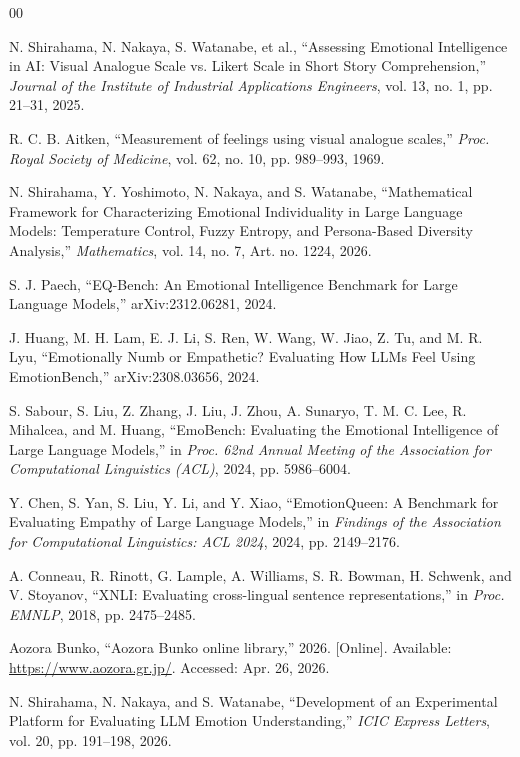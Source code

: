 \documentclass[lualatex,ja=standard,a4paper,11pt]{bxjsarticle}
\begin{document}
\begin{thebibliography}{00}

N. Shirahama, N. Nakaya, S. Watanabe, et al., ``Assessing Emotional Intelligence in AI: Visual Analogue Scale vs. Likert Scale in Short Story Comprehension,'' \emph{Journal of the Institute of Industrial Applications Engineers}, vol. 13, no. 1, pp. 21--31, 2025.

R. C. B. Aitken, ``Measurement of feelings using visual analogue scales,'' \emph{Proc. Royal Society of Medicine}, vol. 62, no. 10, pp. 989--993, 1969.

N. Shirahama, Y. Yoshimoto, N. Nakaya, and S. Watanabe, ``Mathematical Framework for Characterizing Emotional Individuality in Large Language Models: Temperature Control, Fuzzy Entropy, and Persona-Based Diversity Analysis,'' \emph{Mathematics}, vol. 14, no. 7, Art. no. 1224, 2026.

S. J. Paech, ``EQ-Bench: An Emotional Intelligence Benchmark for Large Language Models,'' arXiv:2312.06281, 2024.

J. Huang, M. H. Lam, E. J. Li, S. Ren, W. Wang, W. Jiao, Z. Tu, and M. R. Lyu, ``Emotionally Numb or Empathetic? Evaluating How LLMs Feel Using EmotionBench,'' arXiv:2308.03656, 2024.

S. Sabour, S. Liu, Z. Zhang, J. Liu, J. Zhou, A. Sunaryo, T. M. C. Lee, R. Mihalcea, and M. Huang, ``EmoBench: Evaluating the Emotional Intelligence of Large Language Models,'' in \emph{Proc. 62nd Annual Meeting of the Association for Computational Linguistics (ACL)}, 2024, pp. 5986--6004.

Y. Chen, S. Yan, S. Liu, Y. Li, and Y. Xiao, ``EmotionQueen: A Benchmark for Evaluating Empathy of Large Language Models,'' in \emph{Findings of the Association for Computational Linguistics: ACL 2024}, 2024, pp. 2149--2176.

A. Conneau, R. Rinott, G. Lample, A. Williams, S. R. Bowman, H. Schwenk, and V. Stoyanov, ``XNLI: Evaluating cross-lingual sentence representations,'' in \emph{Proc. EMNLP}, 2018, pp. 2475--2485.

Aozora Bunko, ``Aozora Bunko online library,'' 2026. [Online]. Available: \url{https://www.aozora.gr.jp/}. Accessed: Apr. 26, 2026.

N. Shirahama, N. Nakaya, and S. Watanabe, ``Development of an Experimental Platform for Evaluating LLM Emotion Understanding,'' \emph{ICIC Express Letters}, vol. 20, pp. 191--198, 2026.

\end{thebibliography}
\end{document}
